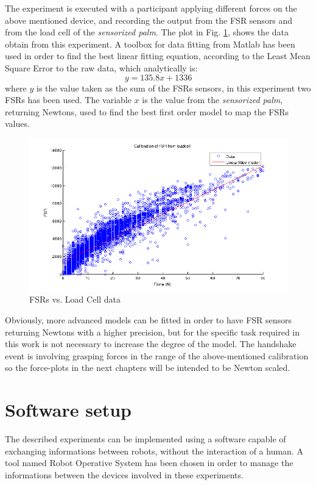 The experiment is executed with a participant applying different forces on the above mentioned device, and recording the output from the FSR sensors and from the load cell of the \textit{sensorized palm}.
The plot in Fig. \ref{Fig:FSRcalibratedModel}, shows the data obtain from this experiment.
A toolbox for data fitting from Matlab has been used in order to find the best linear fitting equation, according to the Least Mean Square Error to the raw data, which analytically is:\\
\begin{equation}
y = 135.8 x + 1336
\end{equation}
where $y$ is the value taken as the sum of the FSRs sensors, in this experiment two FSRs has been used.
The variable $x$ is the value from the \textit{sensorized palm}, returning Newtons, used to find the best first order model to map the FSRs values.\\

 
\begin{figure}[ht]
\centering
\includegraphics[width=\textwidth]{Figure/dummytofsr.png}
\caption{FSRs vs. Load Cell data}
\label{Fig:FSRcalibratedModel}
\end{figure}

Obviously, more advanced models can be fitted in order to have FSR sensors returning Newtons with a higher precision, but for the specific task required in this work is not necessary to increase the degree of the model. The handshake event is involving grasping forces in the range of the above-mentioned calibration so the force-plots in the next chapters will be intended to be Newton scaled.

\chapter{Software setup}
The described experiments can be implemented using a software capable of exchanging informations between robots, without the interaction of a human. A tool named Robot Operative System has been chosen in order to manage the informations between the devices involved in these experiments.  
